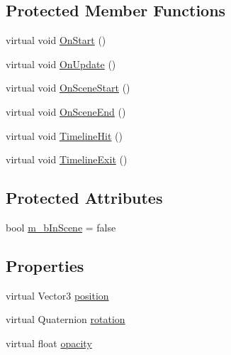 \subsection*{Protected Member Functions}
\begin{DoxyCompactItemize}
\item 
virtual void \mbox{\hyperlink{class_cutscene_object_a23bce7b06c88f20664e646e1e88855a5}{On\+Start}} ()
\item 
virtual void \mbox{\hyperlink{class_cutscene_object_adf319191840e097209184bb0adb69059}{On\+Update}} ()
\item 
virtual void \mbox{\hyperlink{class_cutscene_object_a84f7ddae58243cd84fddf5a3d364cbfa}{On\+Scene\+Start}} ()
\item 
virtual void \mbox{\hyperlink{class_cutscene_object_a028a73ecec97660090c68080ab7939e3}{On\+Scene\+End}} ()
\item 
virtual void \mbox{\hyperlink{class_cutscene_object_a4a4839cf157b8a68ef0ff173f158719c}{Timeline\+Hit}} ()
\item 
virtual void \mbox{\hyperlink{class_cutscene_object_a1d290a7d167c9521ecf27609a90b5f4c}{Timeline\+Exit}} ()
\end{DoxyCompactItemize}
\subsection*{Protected Attributes}
\begin{DoxyCompactItemize}
\item 
bool \mbox{\hyperlink{class_cutscene_object_aab55bc72fd9e5674b14f0d524722993e}{m\+\_\+b\+In\+Scene}} = false
\end{DoxyCompactItemize}
\subsection*{Properties}
\begin{DoxyCompactItemize}
\item 
virtual Vector3 \mbox{\hyperlink{class_cutscene_object_a95de90a33a7c318d3a8009897ed5013c}{position}}
\item 
virtual Quaternion \mbox{\hyperlink{class_cutscene_object_a746d5bfdbf4be010a5696f76c2a15255}{rotation}}
\item 
virtual float \mbox{\hyperlink{class_cutscene_object_a512dbfaffb59e8908a78fa1feb559839}{opacity}}
\end{DoxyCompactItemize}


